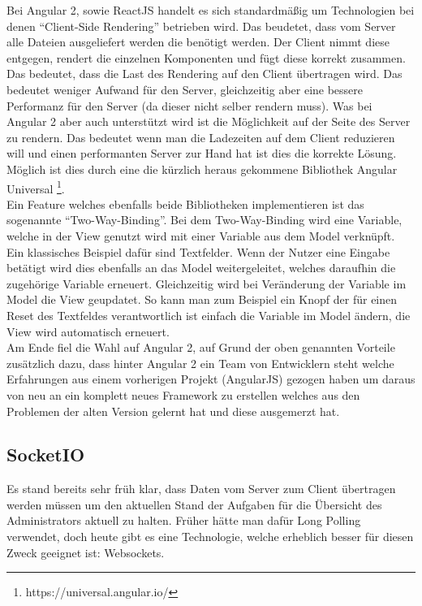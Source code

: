 Bei Angular 2, sowie ReactJS handelt es sich standardmäßig um Technologien bei denen ``Client-Side Rendering'' betrieben wird. Das beudetet, dass vom Server alle Dateien ausgeliefert werden die benötigt werden. Der Client nimmt diese entgegen, rendert die einzelnen Komponenten und fügt diese korrekt zusammen. Das bedeutet, dass die Last des Rendering auf den Client übertragen wird. Das bedeutet weniger Aufwand für den Server, gleichzeitig aber eine bessere Performanz für den Server (da dieser nicht selber rendern muss). Was bei Angular 2 aber auch unterstützt wird ist die Möglichkeit auf der Seite des Server zu rendern. Das bedeutet wenn man  die Ladezeiten auf dem Client reduzieren will und einen performanten Server zur Hand hat ist dies die korrekte Lösung. Möglich ist dies durch eine die kürzlich heraus gekommene Bibliothek Angular Universal  \footnote{https://universal.angular.io/}. \\

Ein Feature welches ebenfalls beide Bibliotheken implementieren ist das sogenannte ``Two-Way-Binding''. Bei dem Two-Way-Binding wird eine Variable, welche in der View genutzt wird mit einer Variable aus dem Model verknüpft. Ein klassisches Beispiel dafür sind Textfelder. Wenn der Nutzer eine Eingabe betätigt wird dies ebenfalls an das Model weitergeleitet, welches daraufhin die zugehörige Variable erneuert. Gleichzeitig wird bei Veränderung der Variable im Model die View geupdatet. So kann man zum Beispiel ein Knopf der für einen Reset des Textfeldes verantwortlich ist einfach die Variable im Model ändern, die View wird automatisch erneuert. \\

Am Ende fiel die Wahl auf Angular 2, auf Grund der oben genannten Vorteile zusätzlich dazu, dass hinter Angular 2 ein Team von Entwicklern steht welche Erfahrungen aus einem vorherigen Projekt (AngularJS) gezogen haben um daraus von neu an ein komplett neues Framework zu erstellen welches aus den Problemen der alten Version gelernt hat und diese ausgemerzt hat.

\subsection{SocketIO}

Es stand bereits sehr früh klar, dass Daten vom Server zum Client übertragen werden müssen um den aktuellen Stand der Aufgaben für die Übersicht des Administrators aktuell zu halten. Früher hätte man dafür Long Polling verwendet, doch heute gibt es eine Technologie, welche erheblich besser für diesen Zweck geeignet ist: Websockets. \\

